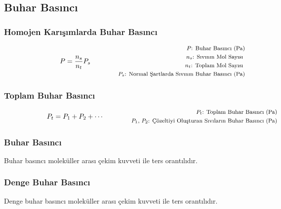 \subsection{Buhar Basıncı}

\subsubsection*{Homojen Karışımlarda Buhar Basıncı}
\begin{equation}
    P = \frac{n_s}{n_t} P_s \qquad \qquad \parbox{4cm}{\footnotesize$\begin{aligned}
        P\text{: Buhar Basıncı (Pa)} \\ 
        n_s\text{: Sıvının Mol Sayısı } \\
        n_t\text{: Toplam Mol Sayısı } \\
        P_s\text{: Normal Şartlarda Sıvının Buhar Basıncı (Pa)} \\ 
\end{aligned}$}
\end{equation}

\subsubsection*{Toplam Buhar Basıncı}
\begin{equation}
    P_t = P_1 + P_2 + \cdots \qquad \qquad \parbox{4cm}{\footnotesize$\begin{aligned}
        P_t\text{: Toplam Buhar Basıncı (Pa)} \\ 
        P_1\text{, }P_2\text{: Çözeltiyi Oluşturan Sıvıların Buhar Basıncı (Pa)}
\end{aligned}$}
\end{equation}

\subsubsection*{Buhar Basıncı}
\begin{theorem}
    Buhar basıncı moleküller arası çekim kuvveti ile ters orantılıdır.
\end{theorem}

\subsubsection*{Denge Buhar Basıncı}
\begin{theorem}
    Denge buhar basıncı moleküller arası çekim kuvveti ile ters orantılıdır.
\end{theorem}